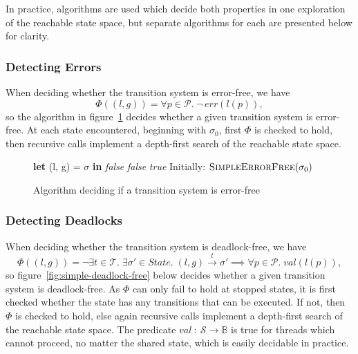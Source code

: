 \documentclass[12pt,a4paper,twoside,openright]{report}
\newcommand{\Let}[2]{\State \textbf{let} #1 = #2 \textbf{in}}
\begin{document}
In practice, algorithms are used which decide both
properties in one exploration of the reachable state space,
but separate algorithms for each are presented
below for clarity.

\subsubsection{Detecting Errors}
When deciding whether the transition system
is error-free, we have
\[
	\Phi((l, g)) = \forall p \in \mathcal{P}.\; \neg\,err(l(p)),
\]
so the algorithm in figure~\ref{fig:simple-error-free}
decides whether a given transition system
is error-free. At each
state encountered, beginning with $\sigma_0$, first $\Phi$
is checked to hold, then recursive calls implement a
depth-first search of the reachable state space.

\begin{figure}
	\begin{algorithmic}[1]
	\Let{(l, g)}{$\sigma$}
		\Return \textit{false}
		\EndIf
	\EndFor {}
		\Return \textit{false}
		\EndIf
	\EndFor
	\State \Return \textit{true}
	\EndProcedure
	\State
	\State Initially: $\textsc{SimpleErrorFree}(\sigma_0)$
	\end{algorithmic}
	\caption{Algorithm deciding if a transition system is error-free}
	\label{fig:simple-error-free}
\end{figure}

\subsubsection{Detecting Deadlocks}
When deciding whether the transition system
is deadlock-free, we have
\[
	\Phi((l, g)) =\neg \exists t \in \mathcal{T}.\;
	\exists\sigma' \in \textit{State}.\;(l, g) \xrightarrow{t} \sigma'
	\implies \forall p \in \mathcal{P}.\;\textit{val}(l(p)),
\]
so figure~\ref{fig:simple-deadlock-free} below decides whether a given transition system
is deadlock-free. As $\Phi$ can only fail to hold
at stopped states, it is first
checked whether the state has any
transitions that can be executed. If not, then
$\Phi$ is checked to hold, else again recursive calls implement a
depth-first search of the reachable state space.
The predicate $\textit{val}~:~\mathcal{S} \to \mathbb{B}$
is true for threads which cannot proceed, no matter the
shared state, which is easily decidable in practice.
\end{document}

